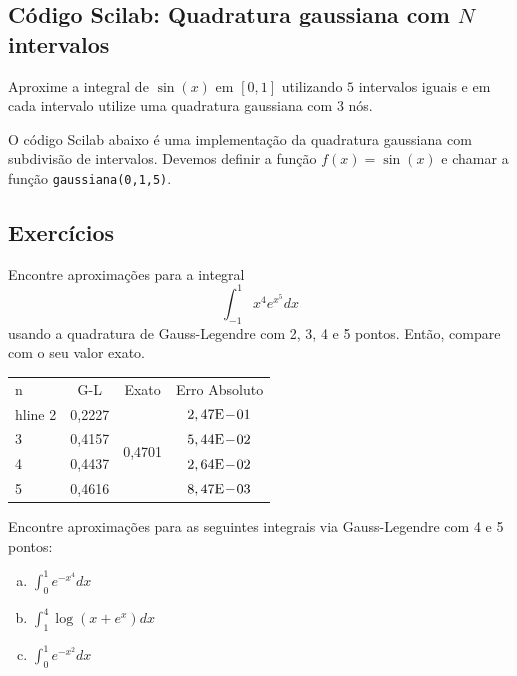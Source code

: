 \ifisscilab
\subsection{Código Scilab: Quadratura gaussiana com $N$ intervalos}
\begin{ex}
Aproxime a integral de $\sin(x)$ em $[0,1]$ utilizando $5$ intervalos iguais e em cada intervalo utilize uma quadratura gaussiana com $3$ nós.
\end{ex}

O código Scilab abaixo é uma implementação da quadratura gaussiana com subdivisão de intervalos. Devemos definir a função $f(x)=\sin(x)$ e chamar a função \verb#gaussiana(0,1,5)#.


\fi

\subsection*{Exercícios}

\begin{exer}Encontre aproximações para a integral
$$\int_{-1}^1 x^4e^{x^5}dx$$
usando a quadratura de Gauss-Legendre com 2, 3, 4 e 5 pontos. Então, compare com o seu valor exato.
\end{exer}
\begin{resp}
  \begin{center}
    \begin{tabular}{l|ccc}
      n& G-L& Exato& Erro Absoluto\\hline
      2& 0,2227 & \multirow{4}{*}{0,4701} & $2,47\mathrm{E}\!-\!01$\\
      3& 0,4157 & & $5,44\mathrm{E}\!-\!02$\\
      4& 0,4437 & & $2,64\mathrm{E}\!-\!02$\\
      5& 0,4616 & & $8,47\mathrm{E}\!-\!03$
    \end{tabular}
  \end{center}
\end{resp}

\begin{exer} Encontre aproximações para as seguintes integrais via Gauss-Legendre com 4 e 5 pontos:
\begin{enumerate}[a)]
\item $\displaystyle \int_0^1 e^{-x^4}dx$
\item $\displaystyle \int_1^4 \log(x+e^x)dx$
\item $\displaystyle \int_0^1 e^{-x^2}dx$
\end{enumerate}
\end{exer}


